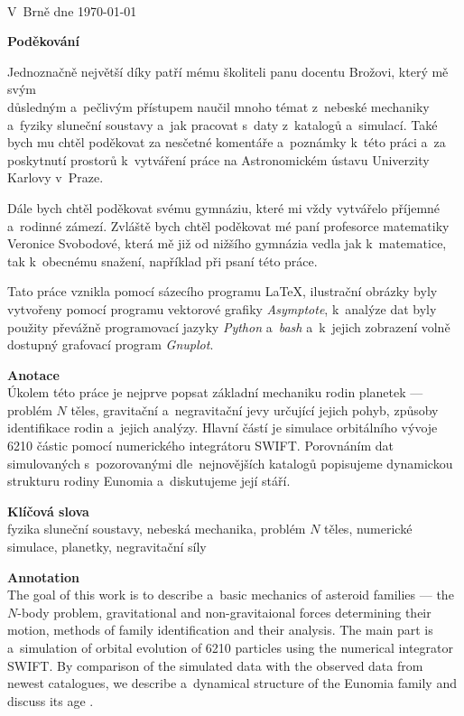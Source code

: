 \documentclass[A4paper, 12pt, oneside, openany]{book}
\begin{document}
\

V~Brně dne \today\ \dotfill \hspace{10mm}

\newpage

{\large \bfseries Poděkování}

Jednoznačně největší díky patří mému školiteli panu docentu Brožovi, který mě svým \\důsledným a~pečlivým přístupem naučil mnoho témat z~nebeské mechaniky a~fyziky sluneční soustavy a~jak pracovat s~daty z~katalogů a~simulací. Také bych mu chtěl poděkovat za nesčetné komentáře a~poznámky k~této práci a~za poskytnutí prostorů k~vytváření práce na Astronomickém ústavu Univerzity Karlovy v~Praze.

Dále bych chtěl poděkovat svému gymnáziu, které mi vždy vytvářelo příjemné a~rodinné zámezí. Zvláště bych chtěl poděkovat mé paní profesorce matematiky Veronice Svobodové, která mě již od nižšího gymnázia vedla jak k~matematice, tak k~obecnému snažení, například při psaní této práce.

Tato práce vznikla pomocí sázecího programu \LaTeX, ilustrační obrázky byly vytvořeny pomocí programu vektorové grafiky \textit{Asymptote}, k~analýze dat byly použity převážně programovací jazyky \textit{Python} a~\textit{bash} a~k~jejich zobrazení volně dostupný grafovací program \textit{Gnuplot}.

\newpage

{\large \bfseries Anotace}\\
Úkolem této práce je nejprve popsat základní mechaniku rodin planetek --- problém $N$ těles, gravitační a~negravitační jevy určující jejich pohyb, způsoby identifikace rodin a~jejich analýzy. Hlavní částí je simulace orbitálního vývoje 6210 částic pomocí numerického integrátoru SWIFT. Porovnáním dat simulovaných s~pozorovanými dle~nejnovějších katalogů popisujeme dynamickou strukturu rodiny Eunomia a~diskutujeme její stáří.

{\large \bfseries Klíčová slova}\\
fyzika sluneční soustavy, nebeská mechanika, problém $N$ těles, numerické simulace, planetky, negravitační síly

\vspace{24pt}

{\large \bfseries Annotation}\\
The goal of this work is to describe a~basic mechanics of asteroid families --- the $N$-body problem, gravitational and non-gravitaional forces determining their motion, methods of family identification and their analysis. The main part is a~simulation of orbital evolution of 6210 particles using the numerical integrator SWIFT. By comparison of the simulated data with the observed data from newest catalogues, we describe a~dynamical structure of the Eunomia family and discuss its age .
\end{document}
